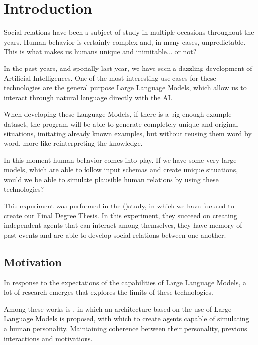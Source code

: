 \chapter*{Introduction}
\label{cap:introduction}


Social relations have been a subject of study in multiple occasions throughout the years. Human behavior is certainly complex and, in many cases, unpredictable. This is what makes us humans unique and inimitable... or not?

In the past years, and specially last year, we have seen a dazzling development of Artificial Intelligences. One of the most interesting use cases for these technologies are the general purpose Large Language Models, which allow us to interact through natural language directly with the AI.

When developing these Language Models, if there is a big enough example dataset, the program will be able to generate completely unique and original situations, imitating already known examples, but without reusing them word by word, more like reinterpreting the knowledge.

In this moment human behavior comes into play. If we have some very large models, which are able to follow input schemas and create unique situations, would we be able to simulate plausible human relations by using these technologies?

This experiment was performed in the \ga (\cite{park2023generative})study, in which we have focused to create our Final Degree Thesis. In this experiment, they succeed on creating independent agents that can interact among themselves, they have memory of past events and are able to develop social relations between one another.

\section*{Motivation}
In response to the expectations of the capabilities of Large Language Models, a lot of research emerges that explores the limits of these technologies.

Among these works is \ga, in which an architecture based on the use of Large Language Models is proposed, with which to create agents capable of simulating a human personality. Maintaining coherence between their personality, previous interactions and motivations.

